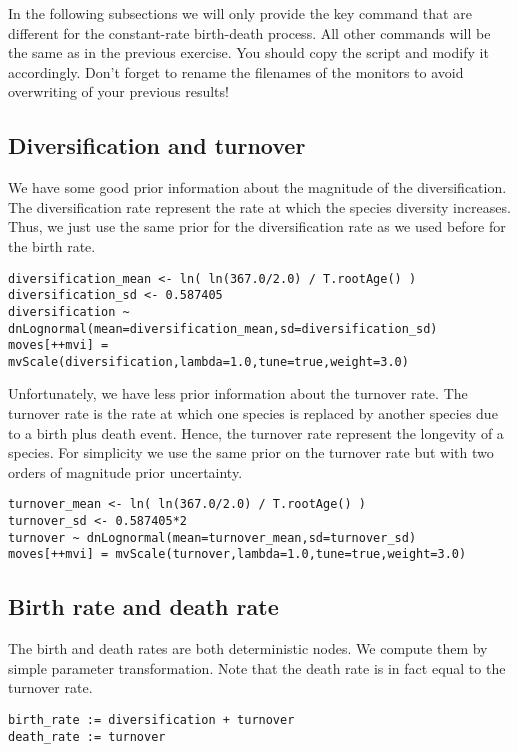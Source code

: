In the following subsections we will only provide the key command that are different for the constant-rate birth-death process.
All other commands will be the same as in the previous exercise.
You should copy the  script and modify it accordingly.
Don't forget to rename the filenames of the monitors to avoid overwriting of your previous results!


\subsection{Diversification and turnover}

We have some good prior information about the magnitude of the diversification.
The diversification rate represent the rate at which the species diversity increases.
Thus, we just use the same prior for the diversification rate as we used before for the birth rate.
{\tt \begin{snugshade*}
\begin{lstlisting}
diversification_mean <- ln( ln(367.0/2.0) / T.rootAge() )
diversification_sd <- 0.587405
diversification ~ dnLognormal(mean=diversification_mean,sd=diversification_sd)
moves[++mvi] = mvScale(diversification,lambda=1.0,tune=true,weight=3.0)
\end{lstlisting}
\end{snugshade*}}

Unfortunately, we have less prior information about the turnover rate.
The turnover rate is the rate at which one species is replaced by another species due to a birth plus death event.
Hence, the turnover rate represent the longevity of a species.
For simplicity we use the same prior on the turnover rate but with two orders of magnitude prior uncertainty.
{\tt \begin{snugshade*}
\begin{lstlisting}
turnover_mean <- ln( ln(367.0/2.0) / T.rootAge() )
turnover_sd <- 0.587405*2
turnover ~ dnLognormal(mean=turnover_mean,sd=turnover_sd)
moves[++mvi] = mvScale(turnover,lambda=1.0,tune=true,weight=3.0)
\end{lstlisting}
\end{snugshade*}}

\subsection{Birth rate and death rate}

The birth and death rates are both deterministic nodes.
We compute them by simple parameter transformation.
Note that the death rate is in fact equal to the turnover rate.
{\tt \begin{snugshade*}
\begin{lstlisting}
birth_rate := diversification + turnover
death_rate := turnover
\end{lstlisting}
\end{snugshade*}}

